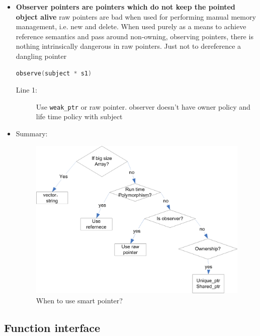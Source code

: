 \documentclass[a4paper,11pt,twoside]{book}
\begin{document}
\begin{itemize}
\item \textbf{Observer pointers are pointers which do not keep the pointed object alive} raw pointers are bad when used for performing manual memory management, i.e. new and delete. When used purely as a means to achieve reference semantics and pass around non-owning, observing pointers, there is nothing intrinsically dangerous in raw pointers. Just not to dereference a dangling pointer
\begin{lstlisting}[frame=single, language=c++]
observe(subject * s1)
\end{lstlisting}
\begin{description}
	\item[Line 1:] Use \texttt{weak\_ptr} or raw pointer. observer doesn't have owner policy and life time policy with subject
\end{description}

\item Summary:
\begin{figure}[h!]
	\centering
	\includegraphics[width=0.95\linewidth]{pics/smartPointer.png}
	\caption{When to use smart pointer?}
	\label{fig:smartpointer}
\end{figure}


\end{itemize}

\subsection{Function interface}
\end{document}
